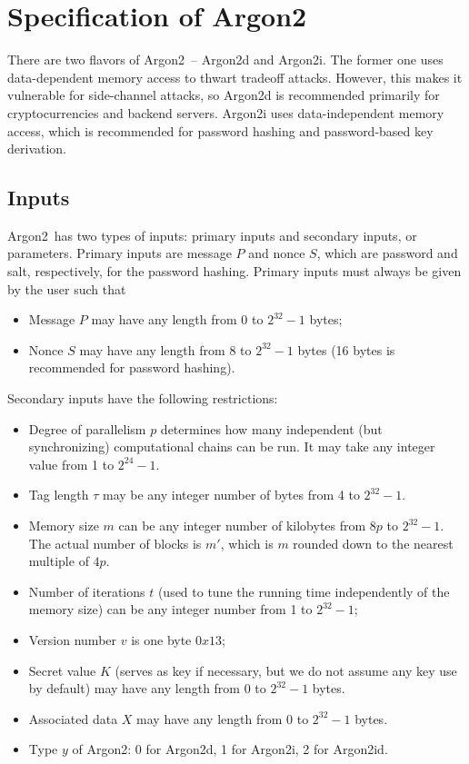 \documentclass[a4paper]{article}
\begin{document}
\section{Specification of Argon2}

There are two flavors of \textsf{Argon2}\ -- \textsf{Argon2d} and \textsf{Argon2i}. The former one uses data-dependent memory access to thwart tradeoff attacks. However, this makes it vulnerable for side-channel attacks, so \textsf{Argon2d} is recommended primarily for cryptocurrencies and backend servers. \textsf{Argon2i} uses data-independent memory access, which is recommended for password hashing and password-based key derivation.

\subsection{Inputs}

\textsf{Argon2}\ has two types of inputs: primary inputs and secondary inputs, or parameters. Primary inputs are message $P$ and nonce $S$, which are password and salt, respectively, for the password hashing. Primary inputs must always be given by the user such that
\begin{itemize}
  \item Message $P$ may have any length from $0$ to $2^{32}-1$ bytes;
  \item Nonce $S$ may have any length from $8$ to $2^{32}-1$ bytes (16 bytes is recommended for password hashing).
\end{itemize}
 Secondary inputs have the following restrictions:
\begin{itemize}
  \item Degree of parallelism $p$ determines how many independent (but synchronizing) computational chains can be run.  It may take any integer value from 1 to $2^{24}-1$.
  \item Tag length $\tau$ may be any integer number of bytes from 4 to $2^{32}-1$.
  \item Memory size $m$ can be any integer number of kilobytes from $8p$ to $2^{32}-1$. The actual number of blocks is $m'$, which is $m$ rounded down to the nearest multiple of $4p$. 
  \item Number of iterations $t$ (used to tune the running time independently of the memory size) can be any integer number from 1 to $2^{32}-1$;
  \item Version number $v$ is one byte $0x13$;
  \item Secret value $K$ (serves as key if necessary, but we do not assume any key use by default) may have any length from $0$ to $2^{32}-1$ bytes.
  \item Associated data $X$ may have any length from $0$ to $2^{32}-1$ bytes.
  \item Type $y$ of \textsf{Argon2}: 0 for  \textsf{Argon2d}, 1 for \textsf{Argon2i}, 2 for \textsf{Argon2id}.
\end{itemize}
\end{document}
